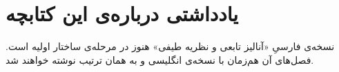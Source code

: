 \chapter*{یادداشتی درباره‌ی این کتابچه}

نسخه‌ی فارسیِ «آنالیز تابعی و نظریه طیفی» هنوز در مرحله‌ی ساختار اولیه است. فصل‌های آن هم‌زمان با نسخه‌ی انگلیسی و به همان ترتیب نوشته خواهند شد.
